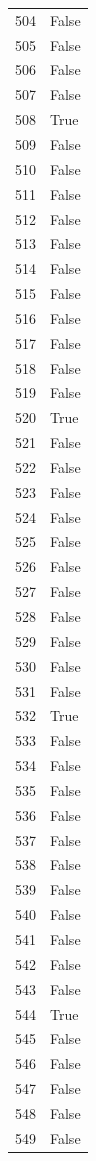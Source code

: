 \documentclass[
  letterpaper,
  DIV=11,
  numbers=noendperiod]{scrreprt}
\begin{document}
\begin{tabular}{ll}
504  &  False \\
505  &  False \\
506  &  False \\
507  &  False \\
508  &   True \\
509  &  False \\
510  &  False \\
511  &  False \\
512  &  False \\
513  &  False \\
514  &  False \\
515  &  False \\
516  &  False \\
517  &  False \\
518  &  False \\
519  &  False \\
520  &   True \\
521  &  False \\
522  &  False \\
523  &  False \\
524  &  False \\
525  &  False \\
526  &  False \\
527  &  False \\
528  &  False \\
529  &  False \\
530  &  False \\
531  &  False \\
532  &   True \\
533  &  False \\
534  &  False \\
535  &  False \\
536  &  False \\
537  &  False \\
538  &  False \\
539  &  False \\
540  &  False \\
541  &  False \\
542  &  False \\
543  &  False \\
544  &   True \\
545  &  False \\
546  &  False \\
547  &  False \\
548  &  False \\
549  &  False \\

\end{tabular}
\end{document}
